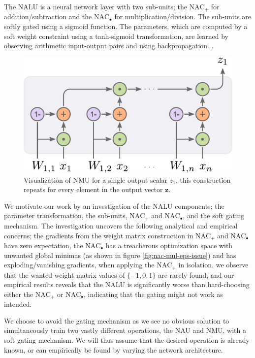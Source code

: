 The NALU is a neural network layer with two sub-units; the $\text{NAC}_{+}$ for addition/subtraction and the $\text{NAC}_{\bullet}$ for multiplication/division.
The sub-units are softly gated using a sigmoid function. The parameters, which are computed by a soft weight constraint using a tanh-sigmoid transformation, are learned by observing arithmetic input-output pairs and using backpropagation. \cite{rumelhart1986learning}.
\begin{figure}[h]
\centering
\includegraphics[scale=0.6]{graphics/nmu.pdf}
\caption{Visualization of NMU for a single output scalar $z_1$, this construction repeats for every element in the output vector $\mathbf{z}$.}
\end{figure}
We motivate our work by an investigation of the NALU components; the parameter transformation, the sub-units, $\text{NAC}_{+}$ and $\text{NAC}_{\bullet}$, and the soft gating mechanism.
The investigation uncovers the following analytical and empirical concerns; the gradients from the weight matrix construction in $\text{NAC}_{+}$ and $\text{NAC}_{\bullet}$ have zero expectation, the $\text{NAC}_{\bullet}$ has a treacherous optimization space with unwanted global minimas (as shown in figure \ref{fig:nac-mul-eps-issue}) and has exploding/vanishing gradients, when applying the $\text{NAC}_{+}$ in isolation, we observe that the wanted weight matrix values of $\{-1, 0, 1\}$ are rarely found, and our empirical results reveals that the NALU is significantly worse than hard-choosing either the $\text{NAC}_{+}$ or $\text{NAC}_{\bullet}$, indicating that the gating might not work as intended.

We choose to avoid the gating mechanism as we see no obvious solution to simultaneously train two vastly different operations, the NAU and NMU, with a soft gating mechanism.
We will thus assume that the desired operation is already known, or can empirically be found by varying the network architecture.


